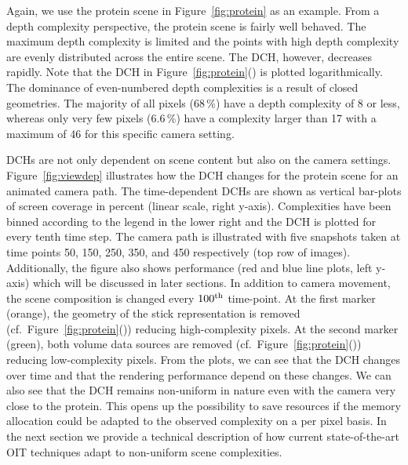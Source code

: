 \documentclass{egpubl}
\newcommand{\dch}{DCH}
\begin{document}
Again, we use the protein scene in Figure~\ref{fig:protein} as an example. 
From a depth complexity perspective, the protein scene is fairly well behaved.
The maximum depth complexity is limited and the points with high depth complexity are evenly distributed across the entire scene. 
The \dch{}, however, decreases rapidly.
Note that the \dch{} in Figure~\ref{fig:protein}() is plotted logarithmically.
The dominance of even-numbered depth complexities is a result of closed geometries. 
The majority of all pixels ($68\,\%$) have a depth complexity of 8 or less, whereas only very few pixels ($6.6\,\%$) have a complexity larger than 17 with a maximum of 46 for this specific camera setting. 

\dch{}s are not only dependent on scene content but also on the camera settings.
Figure~\ref{fig:viewdep} illustrates how the \dch{} changes for the protein scene for an animated camera path.
The time-dependent \dch{}s are shown as vertical bar-plots of screen coverage in percent (linear scale, right y-axis).
Complexities have been binned according to the legend in the lower right and the \dch{} is plotted for every tenth time step.
The camera path is illustrated with five snapshots taken at time points 50, 150, 250, 350, and 450 respectively (top row of images).
Additionally, the figure also shows performance (red and blue line plots, left y-axis) which will be discussed in later sections.
%
In addition to camera movement, the scene composition is changed every $100\textsuperscript{th}$ time-point.
At the first marker (orange), the geometry of the stick representation is removed (cf.~Figure~\ref{fig:protein}()) reducing high-complexity pixels. 
At the second marker (green), both volume data sources are removed (cf.~Figure~\ref{fig:protein}()) reducing low-complexity pixels. 
From the plots, we can see that the \dch{} changes over time and that the rendering performance depend on these changes.
We can also see that the \dch{} remains non-uniform in nature even with the camera very close to the protein.
This opens up the possibility to save resources if the memory allocation could be adapted to the observed complexity on a per pixel basis.
In the next section we provide a technical description of how current state-of-the-art OIT techniques adapt to non-uniform scene complexities. 


\newcommand{\bFraglist}{Fragment List}

\newcommand{\bTarget}{Render Target}
\newcommand{\bAnchor}{List Anchor}
\newcommand{\bPool}{Fragment Pool}
\newcommand{\bAtomic}{Atomic}
\newcommand{\bSemaphore}{Semaphore}
\newcommand{\bArray}{Local Array}
\newcommand{\bCounter}{Complexity Counter}
\end{document}
